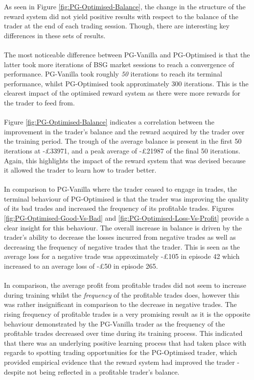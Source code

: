 \documentclass[ %
                    author={Ashwinder Khurana},
                supervisor={Prof Dave Cliff},
                    degree={MEng},
                     title={The Deeply Reinforced Trader},
                  subtitle={},
                      type={enterprise},
                      year={2020} ]{dissertation}
\begin{document}
{As seen in Figure \ref{fig:PG-Optimised-Balance}, the change in the structure of the reward system did not yield positive results with respect to the balance of the trader at the end of each trading session. Though, there are interesting key differences in these sets of results.  
\\
\\
The most noticeable difference between PG-Vanilla and PG-Optimised is that the latter took more iterations of BSG market sessions to reach a convergence of performance. PG-Vanilla took roughly \textit{50} iterations to reach its terminal performance, whilst PG-Optimised took approximately 300 iterations. This is the clearest impact of the optimised reward system as there were more rewards for the trader to feed from. 
\\
\\
Figure \ref{fig:PG-Optimised-Balance} indicates a correlation between the improvement in the trader's balance and the reward acquired by the trader over the training period. The trough of the average balance is present in the first 50 iterations at -£33971, and a peak average of -£21987 of the final 50 iterations. Again, this highlights the impact of the reward system that was devised because it allowed the trader to learn how to trader better. 
\\
\\
\noindent
In comparison to PG-Vanilla where the trader ceased to engage in trades, the terminal behaviour of PG-Optimised is that the trader was improving the quality of its bad trades and increased the frequency of its profitable trades. Figures \ref{fig:PG-Optimised-Good-Vs-Bad} and \ref{fig:PG-Optimised-Loss-Vs-Profit} provide a clear insight for this behaviour. The overall increase in balance is driven by the trader's ability to decrease the losses incurred from negative trades as well as decreasing the frequency of negative trades that the trader. This is seen as the average loss for a negative trade was approximately -£105 in episode 42 which increased to an average loss of -£50 in episode 265. 
\\
\\
In comparison, the average profit from profitable trades did not seem to increase during training whilst the \textit{frequency} of the profitable trades does, however this was rather insignificant in comparison to the decrease in negative trades. The rising frequency of profitable trades is a very promising result as it is the opposite behaviour demonstrated by the PG-Vanilla trader as the frequency of the profitable trades decreased over time during its training process. This indicated that there was an underlying positive learning process that had taken place with regards to spotting trading opportunities for the PG-Optimised trader, which provided empirical evidence that the reward system had improved the trader - despite not being reflected in a profitable trader's balance. 
}
\end{document}
